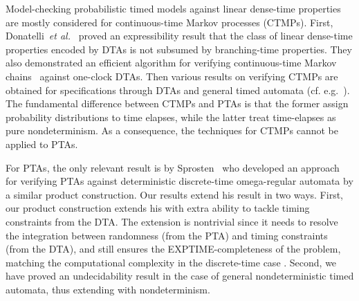 Model-checking probabilistic timed models against linear dense-time properties
are mostly considered for continuous-time Markov processes (CTMPs).
First, Donatelli~\emph{et al.}~\cite{DBLP:journals/tse/DonatelliHS09} proved an expressibility result that the class of linear dense-time properties encoded by DTAs is not subsumed by branching-time properties.
They also demonstrated an efficient algorithm for verifying continuous-time Markov chains~\cite{DBLP:journals/tse/DonatelliHS09} against one-clock DTAs.
Then various results on verifying CTMPs are obtained for specifications through DTAs and general timed automata (cf. e.g.~\cite{DBLP:journals/tse/DonatelliHS09,DBLP:journals/corr/abs-1101-3694,DBLP:conf/hybrid/Fu13,DBLP:conf/hybrid/BrazdilKKKR11,DBLP:conf/tacas/BarbotCHKM11,DBLP:conf/formats/BortolussiL15}).
The fundamental difference between CTMPs and PTAs is that the former assign probability distributions to time elapses, while the latter treat time-elapses as pure nondeterminism.
As a consequence, the techniques for CTMPs cannot be applied to PTAs.

For PTAs, the only relevant result is by Sprosten~\cite{DBLP:conf/qest/Sproston11} who developed an approach for verifying PTAs against deterministic discrete-time omega-regular automata by a similar product construction.
Our results extend his result in two ways.
First, our product construction extends his with extra ability to tackle timing constraints from the DTA.
The extension is nontrivial since it needs to resolve the integration between randomness (from the PTA) and timing constraints (from the DTA), and still ensures the EXPTIME-completeness of the problem, matching the computational complexity in the discrete-time case \cite{DBLP:conf/qest/Sproston11}.
Second, we have proved an undecidability result in the case of general nondeterministic timed automata, thus extending \cite{DBLP:conf/qest/Sproston11} with nondeterminism.



